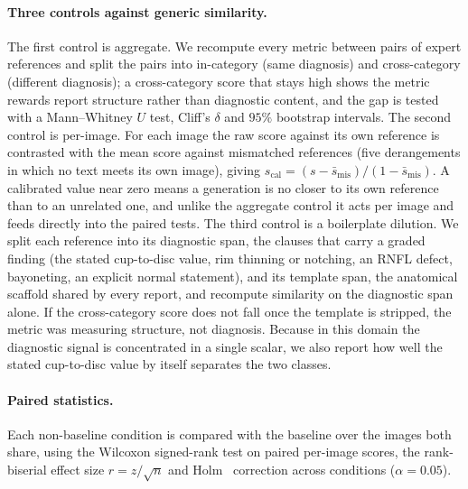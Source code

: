 \documentclass[runningheads]{llncs}
\begin{document}
\paragraph{Three controls against generic similarity.}
The first control is aggregate. We recompute every metric between pairs of expert references and split the pairs into in-category (same diagnosis) and cross-category (different diagnosis); a cross-category score that stays high shows the metric rewards report structure rather than diagnostic content, and the gap is tested with a Mann--Whitney $U$ test, Cliff's $\delta$ and $95\%$ bootstrap intervals. The second control is per-image. For each image the raw score against its own reference is contrasted with the mean score against mismatched references (five derangements in which no text meets its own image), giving $s_{\text{cal}}=(s-\bar s_{\text{mis}})/(1-\bar s_{\text{mis}})$.
A calibrated value near zero means a generation is no closer to its own reference than to an unrelated one, and unlike the aggregate control it acts per image and feeds directly into the paired tests. The third control is a boilerplate dilution. We split each reference into its diagnostic span, the clauses that carry a graded finding (the stated cup-to-disc value, rim thinning or notching, an RNFL defect, bayoneting, an explicit normal statement), and its template span, the anatomical scaffold shared by every report, and recompute similarity on the diagnostic span alone. If the cross-category score does not fall once the template is stripped, the metric was measuring structure, not diagnosis. Because in this domain the diagnostic signal is concentrated in a single scalar, we also report how well the stated cup-to-disc value by itself separates the two classes.

\paragraph{Paired statistics.}
Each non-baseline condition is compared with the baseline over the images both share, using the Wilcoxon signed-rank test on paired per-image scores, the rank-biserial effect size $r=z/\sqrt{n}$ and Holm~\cite{holm1979} correction across conditions ($\alpha=0.05$).
\end{document}
